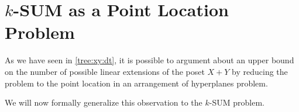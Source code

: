 \chapter{$k$-SUM as a Point Location Problem}

As we have seen in \ref{tree:xy:dt}, it is possible to argument about an upper
bound on the number of possible linear extensions of the poset $X + Y$ by
reducing the problem to the point location in an
arrangement of hyperplanes problem.

We will now formally generalize this observation to the $k$-SUM problem.
